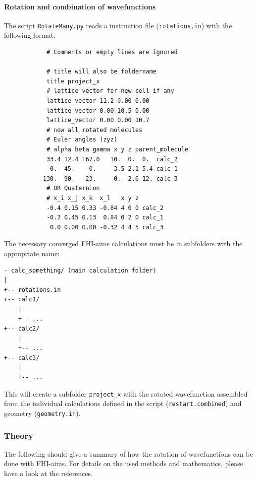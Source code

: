 \paragraph{Rotation and combination of wavefunctions} The script
\texttt{RotateMany.py} reads a instruction file (\texttt{rotations.in}) with the
following format:
\begin{verbatim}
            # Comments or empty lines are ignored

            # title will also be foldername
            title project_x
            # lattice vector for new cell if any
            lattice_vector 11.2 0.00 0.00
            lattice_vector 0.00 10.5 0.00
            lattice_vector 0.00 0.00 10.7
            # now all rotated molecules
            # Euler angles (zyz)
            # alpha beta gamma x y z parent_molecule
            33.4 12.4 167.0   10.  0.  0.  calc_2
             0.  45.    0.     3.5 2.1 5.4 calc_1
           130.  90.   23.     0.  2.6 12. calc_3
            # OR Quaternion
            # x_i x_j x_k  x_l   x y z
            -0.4 0.15 0.33 -0.84 4 0 0 calc_2
            -0.2 0.45 0.13  0.84 0 2 0 calc_1
             0.0 0.00 0.00 -0.32 4 4 5 calc_3
\end{verbatim}

The necessary converged FHI-aims calculations must be in subfolders with the
appropriate name:
\begin{verbatim}
- calc_something/ (main calculation folder)
|
+-- rotations.in
+-- calc1/
    |
    +-- ...
+-- calc2/
    |
    +-- ...
+-- calc3/
    |
    +-- ...

\end{verbatim}
This will create a subfolder \texttt{project\_x} with the rotated wavefunction
assembled from the individual calculations defined in the script
(\texttt{restart.combined}) and geometry (\texttt{geometry.in}).

\subsubsection*{Theory}
\label{Sec:rotated-restarts}
The following should give a summary of how the rotation of wavefunctions can be
done with FHI-aims. For details on the used methods and mathematics, please
have a look at the references.

